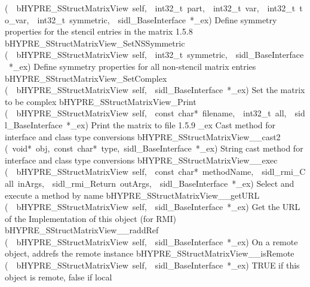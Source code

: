 \documentclass{article}
\begin{document}
\begin{cxxentry}
\begin{cxxentry}
\begin{cxxnames}
        {(\ \ bHYPRE\_SStructMatrixView\ self,\ \ int32\_t\ part,\ \ int32\_t\ var,\ \ int32\_t\ to\_var,\ \ int32\_t\ symmetric,\ \ sidl\_BaseInterface\ *\_ex)}
        {
Define symmetry properties for the stencil entries in the
matrix}
        {1.5.8}
        {bHYPRE\_SStructMatrixView\_SetNSSymmetric}
        {(\ \ bHYPRE\_SStructMatrixView\ self,\ \ int32\_t\ symmetric,\ \ sidl\_BaseInterface\ *\_ex)}
        {
Define symmetry properties for all non-stencil matrix
entries}
        {}
\label{cxx.1.5.11}
        {bHYPRE\_SStructMatrixView\_SetComplex}
        {(\ \ bHYPRE\_SStructMatrixView\ self,\ \ sidl\_BaseInterface\ *\_ex)}
        {
Set the matrix to be complex}
        {}
\label{cxx.1.5.12}
        {bHYPRE\_SStructMatrixView\_Print}
        {(\ \ bHYPRE\_SStructMatrixView\ self,\ \ const\ char*\ filename,\ \ int32\_t\ all,\ \ sidl\_BaseInterface\ *\_ex)}
        {
Print the matrix to file}
        {1.5.9}
        {\_ex}
        {}
        {
Cast method for interface and class type conversions}
        {}
\label{cxx.1.5.13}
        {bHYPRE\_SStructMatrixView\_\_cast2}
        {(\ void*\ obj,\ const\ char*\ type,\ sidl\_BaseInterface\ *\_ex)}
        {
String cast method for interface and class type conversions}
        {}
\label{cxx.1.5.14}
        {bHYPRE\_SStructMatrixView\_\_exec}
        {(\ \ bHYPRE\_SStructMatrixView\ self,\ \ const\ char*\ methodName,\ \ sidl\_rmi\_Call\ inArgs,\ \ sidl\_rmi\_Return\ outArgs,\ \ sidl\_BaseInterface\ *\_ex)}
        {
Select and execute a method by name}
        {}
\label{cxx.1.5.15}
        {bHYPRE\_SStructMatrixView\_\_getURL}
        {(\ \ bHYPRE\_SStructMatrixView\ self,\ \ sidl\_BaseInterface\ *\_ex)}
        {
Get the URL of the Implementation of this object (for RMI)}
        {}
\label{cxx.1.5.16}
        {bHYPRE\_SStructMatrixView\_\_raddRef}
        {(\ \ bHYPRE\_SStructMatrixView\ self,\ \ sidl\_BaseInterface\ *\_ex)}
        {
On a remote object, addrefs the remote instance}
        {}
\label{cxx.1.5.17}
        {bHYPRE\_SStructMatrixView\_\_isRemote}
        {(\ \ bHYPRE\_SStructMatrixView\ self,\ \ sidl\_BaseInterface\ *\_ex)}
        {
TRUE if this object is remote, false if local}

\end{cxxnames}
\end{cxxentry}
\end{cxxentry}
\end{document}
